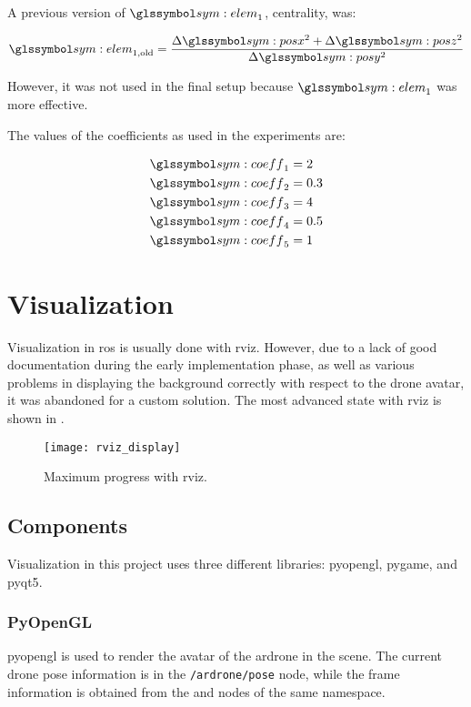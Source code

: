       A previous version of $\sym{elem}_1$, centrality, was:

      \begin{equation}
	\sym{elem}_{1,\mathrm{old}} = \frac{\Delta\sym{posx}^2 + \Delta\sym{posz}^2}{\Delta\sym{posy}^2}
      \end{equation}

      However, it was not used in the final setup because $\sym{elem}_1$ was more effective.  %

      The values of the coefficients as used in the experiments are:

      \begin{align*}
	\sym{coeff}_1 &= 2 \\
	\sym{coeff}_2 &= 0.3 \\
	\sym{coeff}_3 &= 4 \\
	\sym{coeff}_4 &= 0.5 \\
	\sym{coeff}_5 &= 1
      \end{align*}


\chapter{Visualization}
  Visualization in \gls{ros} is usually done with \gls{rviz}.
  However, due to a lack of good documentation during the early implementation phase, as well as various problems in displaying the background correctly with respect to the drone avatar, it was abandoned for a custom solution.
  The most advanced state with \gls{rviz} is shown in .

  \begin{figure}[h]
    \centering
    \texttt{[image: rviz\_display]}
    \caption[rviz maximum progress]{Maximum progress with \gls{rviz}.}
    \label{fig:rviz_display}
  \end{figure}

  \section{Components}
    Visualization in this project uses three different libraries: \gls{pyopengl}, \gls{pygame}, and \gls{pyqt5}.

    \subsection{PyOpenGL}
    \gls{pyopengl} is used to render the avatar of the \gls{ardrone} in the scene.
    The current drone pose information is in the \texttt{/ardrone/pose} node, while the frame information is obtained from the \texttt{} and \texttt{} nodes of the same namespace.

